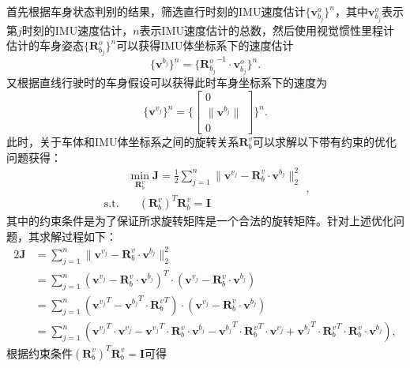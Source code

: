 首先根据车身状态判别的结果，筛选直行时刻的IMU速度估计$\{\symbf{v}^o_{b_{j}}\}^n$，其中$\symbf{v}^o_{b_{j}}$表示第$j$时刻的IMU速度估计，$n$表示IMU速度估计的总数，然后使用视觉惯性里程计估计的车身姿态$\{ \symbf{R}_{b_{j}}^o\}^n$可以获得IMU体坐标系下的速度估计
\begin{equation}
  \{\symbf{v}^{b_{j}}\}^n = \{ {\symbf{R}_{b_{j}}^o}^{-1} \cdot \symbf{v}^o_{b_{j}} \}^n.
\end{equation}
又根据直线行驶时的车身假设可以获得此时车身坐标系下的速度为
\begin{equation}
  \{\symbf{v}^{v_{j}}\}^n = \{ \begin{bmatrix}
    0 \\
    \| \symbf{v}^{b_{j}} \| \\ 
    0
  \end{bmatrix}\}^n.
\end{equation}
此时，关于车体和IMU体坐标系之间的旋转关系$\symbf{R}_{b}^{v}$可以求解以下带有约束的优化问题获得：
\begin{equation}
\begin{aligned}
  &\min_{\symbf{R}_{b}^{v}} \symbf{J} = \frac{1}{2} \sum_{j=1}^{n} \| \symbf{v}^{v_{j}} - \symbf{R}_{b}^{v} \cdot \symbf{v}^{b_{j}} \|_2^2 \\
  \text{s.t.} & \quad {(\symbf{R}_{b}^{v})}^T \symbf{R}_{b}^{v} = \symbf{I}
\end{aligned},
\end{equation}
其中的约束条件是为了保证所求旋转矩阵是一个合法的旋转矩阵。针对上述优化问题，其求解过程如下：
\begin{align}
  2\symbf{J} &= \sum_{j=1}^{n} \| \symbf{v}^{v_{j}} - \symbf{R}_{b}^{v} \cdot \symbf{v}^{b_{j}} \|_2^2 \\ 
  &= \sum_{j=1}^{n} {(\symbf{v}^{v_{j}} - \symbf{R}_{b}^{v} \cdot \symbf{v}^{b_{j}})}^T \cdot {(\symbf{v}^{v_{j}} - \symbf{R}_{b}^{v} \cdot \symbf{v}^{b_{j}})} \\
  &= \sum_{j=1}^{n} {({\symbf{v}^{v_{j}}}^T - {\symbf{v}^{b_{j}}}^T \cdot {\symbf{R}_{b}^{v}}^T)} \cdot {(\symbf{v}^{v_{j}} - \symbf{R}_{b}^{v} \cdot \symbf{v}^{b_{j}})} \\
  &= \sum_{j=1}^{n} ({\symbf{v}^{v_{j}}}^T \cdot \symbf{v}^{v_{j}} - {\symbf{v}^{v_{j}}}^T \cdot \symbf{R}_{b}^{v} \cdot \symbf{v}^{b_{j}} - {\symbf{v}^{b_{j}}}^T \cdot {\symbf{R}_{b}^{v}}^T \cdot {\symbf{v}^{v_{j}}} + {\symbf{v}^{b_{j}}}^T \cdot {\symbf{R}_{b}^{v}}^T \cdot \symbf{R}_{b}^{v} \cdot \symbf{v}^{b_{j}}),
\end{align}
根据约束条件${(\symbf{R}_{b}^{v})}^T \symbf{R}_{b}^{v} = \symbf{I}$可得
